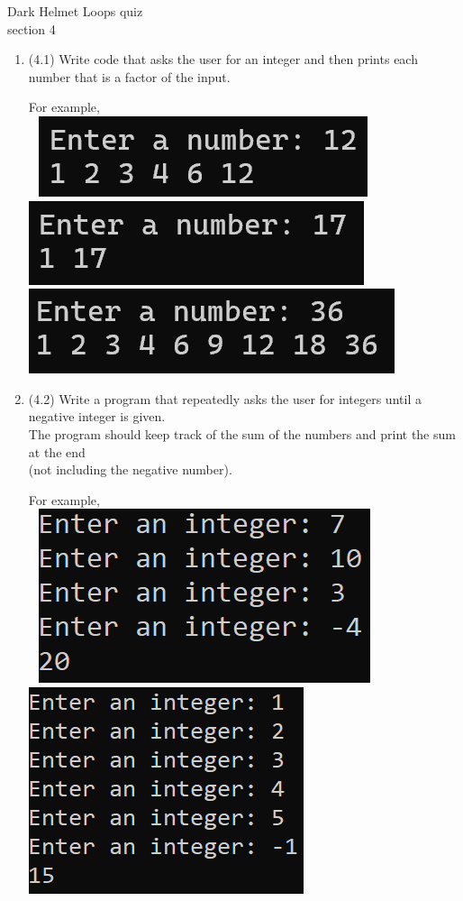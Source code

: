 \documentclass{article}
\begin{document}
\begin{enumerate}

\end{enumerate}
\pagebreak
Dark Helmet \hfill Loops quiz\\
section 4\\
\begin{enumerate}
\item (4.1)  
		Write code that asks the user for an integer and then prints each number that is a 
		factor of the input.
	
		For example, \\ \ \hfill
		\includegraphics[height = .35in]{./imgs/factors1.PNG} \hfill  
		\includegraphics[height = .35in]{./imgs/factors2.PNG} \hfill  
		\includegraphics[height = .35in]{./imgs/factors3.PNG} \hfill \


\item (4.2)  
		Write a program that repeatedly asks the user for integers until a negative integer is 
		given. \\ The program should keep track of the sum of the numbers and print the sum at the 
		end \\(not including the negative number).

		For example, \\ \ \hfill
		\includegraphics[width = 2.in]{./imgs/AddCalc2.PNG} \hfill  
		\includegraphics[width = 2.in]{./imgs/AddCalc1.PNG} \hfill \



\end{enumerate}
\end{document}
